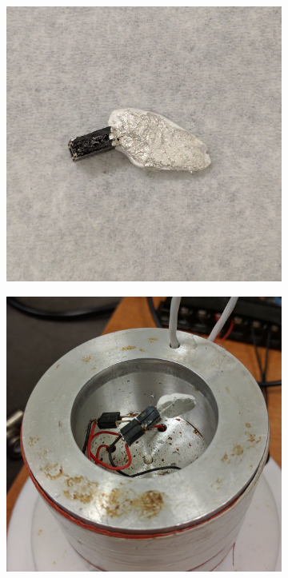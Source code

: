 \documentclass[%
 reprint,
 amsmath,amssymb,
 aps,
 pra,
]{revtex4-1}
\begin{document}
\begin{figure}[H]
\begin{subfigure}{0.22\textwidth}
		\caption{}
		\label{fig:sample:thickness}
	\end{subfigure}
	\begin{subfigure}{0.22\textwidth}
		\includegraphics[width=\textwidth]{sample_complete.jpg}
		\caption{}
		\label{fig:sample:final}
	\end{subfigure}
	\begin{subfigure}{0.22\textwidth}
		\includegraphics[width=\textwidth]{sample_inplace.jpg}

\end{subfigure}
\end{figure}
\end{document}
